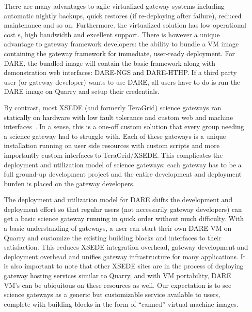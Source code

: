 \documentclass[]{svjour3}
\begin{document}
There are many advantages to agile virtualized gateway systems
including automatic nightly backups, quick restores (if re-deploying
after failure), reduced maintenance and so on. Furthermore, the
virtualized solution has low operational cost	s, high bandwidth and
excellent support. There is however a unique advantage to gateway
framework developers: the ability to bundle a VM image containing the
gateway framework for immediate, user-ready deployment. For DARE, the
bundled image will contain the basic framework along with
demonstration web interfaces: DARE-NGS and DARE-HTHP. If a third party
user (or gateway developer) wants to use DARE, all users have to do is
run the DARE image on Quarry and setup their credentials.

By contrast, most XSEDE (and formerly TeraGrid) science gateways ran
statically on hardware with low fault tolerance and custom web and
machine interfaces~\cite{xsedegateways}. In a
sense, this is a one-off custom solution that every group needing a
science gateway had to struggle with. Each of these gateways is a
unique installation running on user side resources with custom scripts
and more importantly custom interfaces to TeraGrid/XSEDE. This
complicates the deployment and utilization model of science gateways:
each gateway has to be a full ground-up development project and the
entire development and deployment burden is placed on the gateway
developers.

The deployment and utilization model for DARE shifts the development
and deployment effort so that regular users (not necessarily gateway
developers) can get a basic science gateway running in quick order
without much difficulty. With a basic understanding of gateways, a
user can start their own DARE VM on Quarry and customize the existing
building blocks and interfaces to their satisfaction. This reduces
XSEDE integration overhead, gateway development and deployment
overhead and unifies gateway infrastructure for many applications. It
is also important to note that other XSEDE sites are in the process of
deploying gateway hosting services similar to Quarry, and with VM
portability, DARE VM's can be ubiquitous on these resources as
well. Our expectation is to see science gateways as a generic but
customizable service available to users, complete with building blocks
in the form of ``canned'' virtual machine images.
\end{document}

